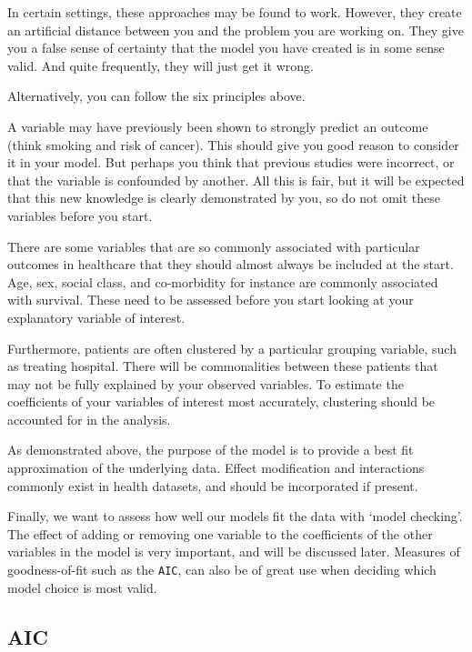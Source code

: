 \documentclass[
  12pt,
  krantz2]{krantz}
\begin{document}
In certain settings, these approaches may be found to work.
However, they create an artificial distance between you and the problem you are working on.
They give you a false sense of certainty that the model you have created is in some sense valid.
And quite frequently, they will just get it wrong.

Alternatively, you can follow the six principles above.

A variable may have previously been shown to strongly predict an outcome (think smoking and risk of cancer).
This should give you good reason to consider it in your model.
But perhaps you think that previous studies were incorrect, or that the variable is confounded by another.
All this is fair, but it will be expected that this new knowledge is clearly demonstrated by you, so do not omit these variables before you start.

There are some variables that are so commonly associated with particular outcomes in healthcare that they should almost always be included at the start.
Age, sex, social class, and co-morbidity for instance are commonly associated with survival.
These need to be assessed before you start looking at your explanatory variable of interest.

Furthermore, patients are often clustered by a particular grouping variable, such as treating hospital.
There will be commonalities between these patients that may not be fully explained by your observed variables.
To estimate the coefficients of your variables of interest most accurately, clustering should be accounted for in the analysis.

As demonstrated above, the purpose of the model is to provide a best fit approximation of the underlying data.
Effect modification and interactions commonly exist in health datasets, and should be incorporated if present.

Finally, we want to assess how well our models fit the data with `model checking'.
The effect of adding or removing one variable to the coefficients of the other variables in the model is very important, and will be discussed later.
Measures of goodness-of-fit such as the \texttt{AIC}, can also be of great use when deciding which model choice is most valid.

\hypertarget{chap07-aic}{%
\subsection{AIC}\label{chap07-aic}}

\end{document}
